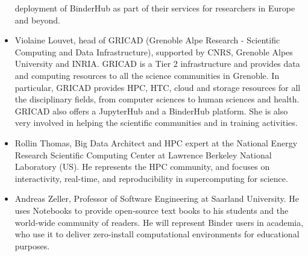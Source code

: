 \begin{itemize}
  deployment of BinderHub as part of their services for researchers in Europe
  and beyond.
\item Violaine Louvet, head of GRICAD (Grenoble Alpe Research -
 Scientific Computing and Data Infrastructure), supported by
 CNRS, Grenoble Alpes University and INRIA. GRICAD is a Tier 2
 infrastructure and provides data and computing resources to all the
 science communities in Grenoble. In particular, GRICAD provides HPC,
 HTC, cloud and storage resources for all the disciplinary fields,
 from computer sciences to human sciences and health. GRICAD
 also offers a JupyterHub and a BinderHub platform. She is also very
 involved in helping the scientific communities and in training activities.
 \item Rollin Thomas, Big Data Architect and HPC expert at the National Energy
  Research Scientific Computing Center at Lawrence Berkeley National Laboratory
  (US). He represents the HPC community, and focuses on interactivity,
  real-time, and reproducibility in supercomputing for science.
\item Andreas Zeller, Professor of Software Engineering at Saarland University. He uses Notebooks
  to provide open-source text books to his students and the world-wide
  community of readers. He will represent Binder users in academia, who use it
  to deliver zero-install computational environments for educational
  purposes.
\end{itemize}
